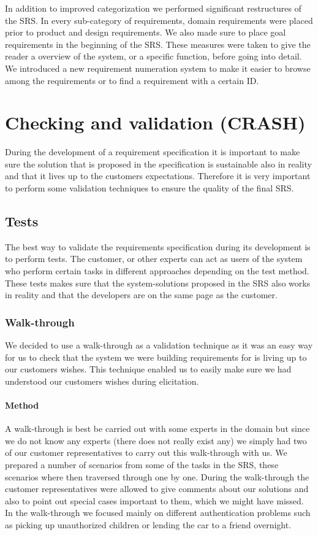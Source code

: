 \documentclass[10pt]{article}
\begin{document}
In addition to improved categorization we performed significant restructures of the SRS. In every sub-category of requirements, domain requirements were placed prior to product and design requirements. We also made sure to place goal requirements in the beginning of the SRS. These measures were taken to give the reader a overview of the system, or a specific function, before going into detail.
We introduced a new requirement numeration system to make it easier to browse among the requirements or to find a requirement with a certain ID.

\section{Checking and validation (CRASH)}
\noindent
During the development of a requirement specification it is important to make sure the solution that is proposed in the specification is sustainable also in reality and that it lives up to the customers expectations. Therefore it is very important to perform some validation techniques to ensure the quality of the final SRS.

\subsection{Tests}
The best way to validate the requirements specification during its development is to perform tests. The customer, or other experts can act as users of the system who perform certain tasks in different approaches depending on the test method. These tests makes sure that the system-solutions proposed in the SRS also works in reality and that the developers are on the same page as the customer.

\subsubsection{Walk-through}
We decided to use a walk-through as a validation technique as it was an easy way for us to check that the system we were building requirements for is living up to our customers wishes. This technique enabled us to easily make sure we had understood our customers wishes during elicitation.

\paragraph{Method}
\hfill \break
A walk-through is best be carried out with some experts in the domain but since we do not know any experts (there does not really exist any) we simply had two of our customer representatives to carry out this walk-through with us.
We prepared a number of scenarios from some of the tasks in the SRS, these scenarios where then traversed through one by one. During the walk-through the customer representatives were allowed to give comments about our solutions and also to point out special cases important to them, which we might have missed. In the walk-through we focused mainly on different authentication problems such as picking up unauthorized children or lending the car to a friend overnight.
\end{document}
